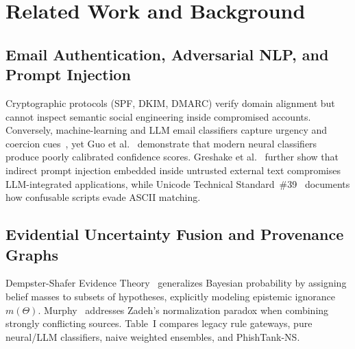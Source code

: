 \documentclass[conference]{IEEEtran}
\begin{document}
\section{Related Work and Background}

\subsection{Email Authentication, Adversarial NLP, and Prompt Injection}
Cryptographic protocols (SPF, DKIM, DMARC) verify domain alignment but cannot inspect semantic social engineering inside compromised accounts. Conversely, machine-learning and LLM email classifiers capture urgency and coercion cues~\cite{pedregosa2011scikit}, yet Guo et al.~\cite{guo2017calibration} demonstrate that modern neural classifiers produce poorly calibrated confidence scores. Greshake et al.~\cite{greshake2023indirect} further show that indirect prompt injection embedded inside untrusted external text compromises LLM-integrated applications, while Unicode Technical Standard~\#39~\cite{unicode2024uts39} documents how confusable scripts evade ASCII matching.

\subsection{Evidential Uncertainty Fusion and Provenance Graphs}
Dempster-Shafer Evidence Theory~\cite{dempster1967upper,shafer1976mathematical} generalizes Bayesian probability by assigning belief masses to subsets of hypotheses, explicitly modeling epistemic ignorance $m(\Theta)$. Murphy~\cite{murphy2000combining} addresses Zadeh's normalization paradox when combining strongly conflicting sources. Table~I compares legacy rule gateways, pure neural/LLM classifiers, naive weighted ensembles, and PhishTank-NS.
\end{document}
